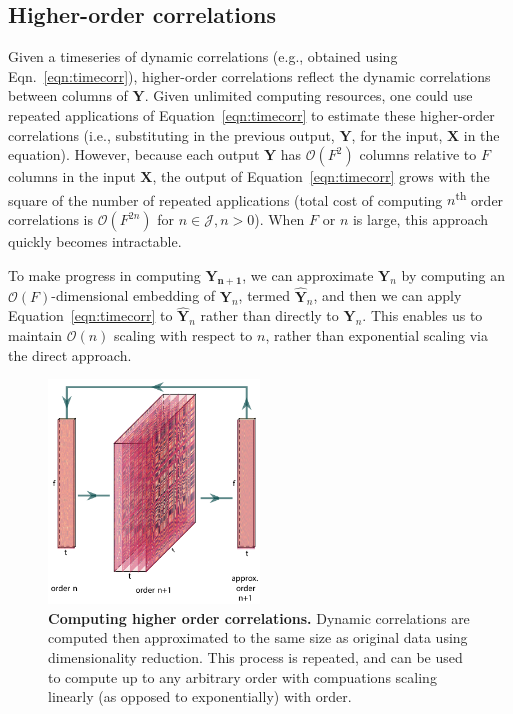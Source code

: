 \documentclass[english]{article}
\begin{document}
\subsection*{Higher-order correlations}
Given a timeseries of dynamic correlations (e.g., obtained using
Eqn.~\ref{eqn:timecorr}), higher-order correlations reflect the
dynamic correlations between columns of $\mathbf{Y}$.  Given unlimited
computing resources, one could use repeated applications of
Equation~\ref{eqn:timecorr} to estimate these higher-order
correlations (i.e., substituting in the previous output, $\mathbf{Y}$,
for the input, $\mathbf{X}$ in the equation).  However, because each
output $\mathbf{Y}$ has $\mathcal{O}(F^2)$ columns relative to $F$ columns in
the input $\mathbf{X}$, the output of Equation~\ref{eqn:timecorr}
grows with the square of the number of repeated applications (total
cost of computing $n$\textsuperscript{th} order correlations is
$\mathcal{O}(F^{2n})$ for $n \in \mathcal{J}, n > 0$).  When $F$ or $n$ is large,
this approach quickly becomes intractable.

To make progress in computing $\mathbf{Y_{n+1}}$, we can approximate
$\mathbf{Y}_n$ by computing an $\mathcal{O}(F)$-dimensional embedding of
$\mathbf{Y}_n$, termed $\hat{\mathbf{Y}}_n$, and then we can apply
Equation~\ref{eqn:timecorr} to $\hat{\mathbf{Y}}_n$ rather than
directly to $\mathbf{Y}_n$.  This enables us to maintain $\mathcal{O}(n)$
scaling with respect to $n$, rather than exponential scaling via the
direct approach.

\begin{figure}
  \centering
  \includegraphics[width=0.5\textwidth]{figs/methods_fig}
  \caption{\textbf{Computing higher order correlations. } Dynamic
    correlations
  are computed then approximated to the same size as original data
  using dimensionality reduction.
  This process is repeated, and can be used to compute up to any
  arbitrary order with compuations scaling linearly (as opposed to exponentially) with order. }
  \label{fig:methods_fig}
\end{figure}
\end{document}
